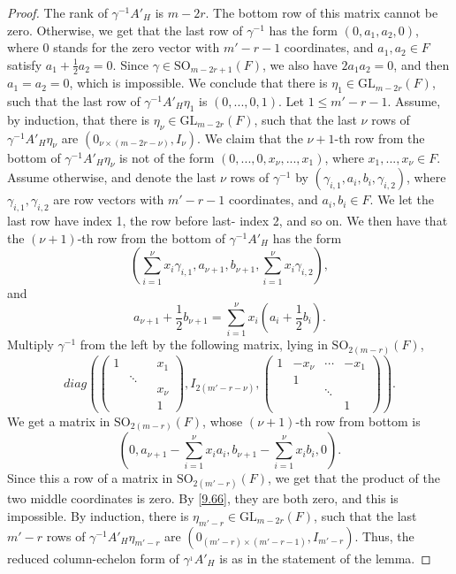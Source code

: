 \documentclass[12pts]{amsart}
\newcommand{\GL}{{\mathrm{GL}}}
\newcommand{\SO}{{\mathrm{SO}}}
\begin{document}
\begin{proof}
The rank of $\gamma^{-1}A'_H$ is $m-2r$. The bottom row of this matrix cannot be zero. Otherwise, we get that the last row of $\gamma^{-1}$ has the form $(0,a_1,a_2,0)$, where $0$ stands for the zero vector with $m'-r-1$ coordinates, and $a_1,a_2\in F$ satisfy $a_1+\frac{1}{2}a_2=0$. Since $\gamma\in \SO_{m-2r+1}(F)$, we also have $2a_1a_2=0$, and then $a_1=a_2=0$, which is impossible. We conclude that there is $\eta_1\in \GL_{m-2r}(F)$, such that the last row of $\gamma^{-1}A'_H\eta_1$ is $(0,...,0,1)$. Let $1\leq m'-r-1$. Assume, by induction, that there is $\eta_\nu\in \GL_{m-2r}(F)$, such that the last $\nu$ rows of $\gamma^{-1}A'_H\eta_\nu$ are $(0_{\nu\times (m-2r-\nu)}, I_\nu)$. We claim that the $\nu+1$-th row from the bottom of $\gamma^{-1}A'_H\eta_\nu$ is not of the form $(0,...,0,x_\nu,...,x_1)$, where $x_1,...,x_\nu\in F$. Assume otherwise, and denote the last $\nu$ rows of $\gamma^{-1}$ by $(\gamma_{i,1},a_i,b_i,\gamma_{i,2})$, where $\gamma_{i,1}, \gamma_{i,2}$ are row vectors with $m'-r-1$ coordinates, and $a_i,b_i\in F$. We let the last row have index 1, the row before last- index 2, and so on. We then have that the $(\nu+1)$-th row from the bottom of $\gamma^{-1}A'_H$ has the form 
$$
(\sum_{i=1}^\nu x_i\gamma_{i,1},a_{\nu+1},b_{\nu+1}, \sum_{i=1}^\nu x_i\gamma_{i,2}),
$$  
and 
\begin{equation}\label{9.66}
a_{\nu+1}+\frac{1}{2}b_{\nu+1}=\sum_{i=1}^\nu x_i(a_i+\frac{1}{2}b_i).
\end{equation} 
Multiply $\gamma^{-1}$ from the left by the following matrix, lying in $\SO_{2(m-r)}(F)$,
$$
diag(\begin{pmatrix}1&&&x_1\\&\ddots\\&&&x_\nu\\&&&1\end{pmatrix},I_{2(m'-r-\nu)},\begin{pmatrix}1&-x_\nu&\cdots&-x_1\\&1\\&&\ddots\\&&&1\end{pmatrix}).
$$
We get a matrix in $\SO_{2(m-r)}(F)$, whose $(\nu+1)$-th row from bottom is
$$
(0,a_{\nu+1}-\sum_{i=1}^\nu x_ia_i,b_{\nu+1}-\sum_{i=1}^\nu x_ib_i,0).
$$
Since this a row of a matrix in $\SO_{2(m'-r)}(F)$, we get that the product of the two middle coordinates is zero. By \eqref{9.66}, they are both zero, and this is impossible. By induction, there is $\eta_{m'-r}\in \GL_{m-2r}(F)$, such that the last $m'-r$ rows of $\gamma^{-1}A'_H\eta_{m'-r}$ are $(0_{(m'-r)\times (m'-r-1)},I_{m'-r})$. Thus, the reduced column-echelon form of $\gamma^{_1}A'_H$ is as in the statement of the lemma.
\end{proof} 
\end{document}
